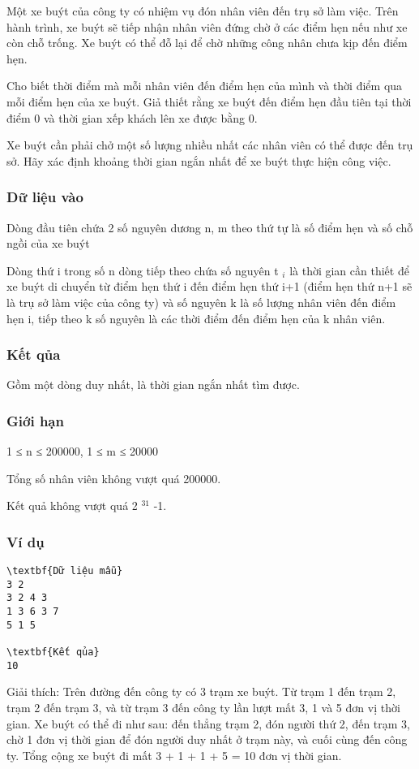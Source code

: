 



   Một xe buýt của công ty có nhiệm vụ đón nhân viên đến trụ sở làm việc. Trên hành trình, xe buýt sẽ tiếp nhận nhân viên đứng chờ ở các điểm hẹn   nếu như xe còn chỗ trống. Xe buýt có thể đỗ lại để chờ những công nhân chưa kịp đến điểm hẹn.  

   Cho biết thời điểm mà mỗi nhân viên đến điểm hẹn của mình và thời điểm qua mỗi điểm hẹn của xe buýt. Giả thiết rằng xe buýt đến điểm hẹn đầu   tiên tại thời điểm 0 và thời gian xếp khách lên xe được bằng 0.  

   Xe buýt cần phải chở một số lượng nhiều nhất các nhân viên có thể được đến trụ sở. Hãy xác định khoảng thời gian ngắn nhất để xe buýt thực hiện   công việc.  

\subsubsection{   Dữ liệu vào  }

   Dòng đầu tiên chứa 2 số nguyên dương n, m theo thứ tự là số điểm hẹn và số chỗ ngồi của xe buýt  

   Dòng thứ i trong số n dòng tiếp theo chứa số nguyên t   $_    i   $   là thời gian cần thiết để xe buýt di chuyển từ điểm hẹn thứ i đến điểm hẹn thứ   i+1 (điểm hẹn thứ n+1 sẽ là trụ sở làm việc của công ty) và số nguyên k là số lượng nhân viên đến điểm hẹn i, tiếp theo k số nguyên là các thời điểm đến   điểm hẹn của k nhân viên.  

\subsubsection{   Kết qủa  }

   Gồm một dòng duy nhất, là thời gian ngắn nhất tìm được.  

\subsubsection{   Giới hạn  }

   1 ≤ n ≤ 200000, 1 ≤ m ≤ 20000  

   Tổng số nhân viên không vượt quá 200000.  

   Kết quả không vượt quá 2   $^    31   $   -1.  

\subsubsection{   Ví dụ  }
\begin{verbatim}
\textbf{Dữ liệu mẫu}
3 2
3 2 4 3
1 3 6 3 7
5 1 5

\textbf{Kết qủa}
10
\end{verbatim}

   Giải thích: Trên đường đến công ty có 3 trạm xe buýt. Từ trạm 1 đến trạm 2, trạm 2 đến trạm 3, và từ trạm 3 đến công ty lần lượt mất 3, 1 và 5 đơn vị thời gian. Xe buýt có thể đi như sau: đến thẳng trạm 2, đón người thứ 2, đến trạm 3, chờ 1 đơn vị thời gian để đón người duy nhất ở trạm này, và cuối cùng đến công ty. Tổng cộng xe buýt đi mất 3 + 1 + 1 + 5 = 10 đơn vị thời gian.  